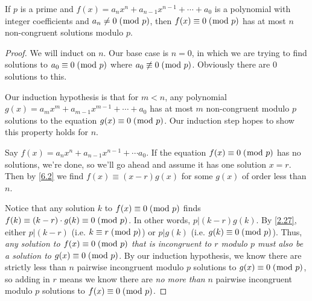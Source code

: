 \documentclass[../main.tex]{subfiles}
\begin{document}
\begin{thm} \label{6.3}
  If $p$ is a prime and $f(x) = a_n x^n + a_{n-1} x^{n-1} + \cdots + a_0$ is a polynomial with integer coefficients and $a_n \neq 0 \; (\bmod \; p)$, then $f(x) \equiv 0 \; (\bmod \; p)$ has at most $n$ non-congruent solutions modulo $p$.
\end{thm}

\begin{proof}
  We will induct on $n$. Our base case is $n = 0$, in which we are trying to find solutions to $a_0 \equiv 0 \; (\bmod \; p)$ where $a_0 \not \equiv 0 \; (\bmod \; p)$. Obviously there are $0$ solutions to this.

  Our induction hypothesis is that for $m < n$, any polynomial $g(x) = a_m x^m + a_{m-1} x^{m-1} + \cdots + a_0$ has at most $m$ non-congruent modulo $p$ solutions to the equation $g(x) \equiv 0 \; (\bmod \; p)$. Our induction step hopes to show this property holds for $n$.

  Say $f(x) = a_n x^n + a_{n-1} x^{n-1} + \cdots a_0$. If the equation $f(x) \equiv 0 \; (\bmod \; p)$ has no solutions, we're done, so we'll go ahead and assume it has one solution $x = r$. Then by \ref{6.2} we find $f(x) \equiv (x-r) g(x)$ for some $g(x)$ of order less than $n$.

  Notice that any solution $k$ to $f(x) \equiv 0 \; (\bmod \; p)$ finds $f(k) \equiv (k-r) \cdot g(k) \equiv 0 \; (\bmod \; p)$. In other words, $p | (k-r)g(k)$. By \ref{2.27}, either $p | (k-r)$ (i.e. $k \equiv r \; (\bmod \; p)$) or $p | g(k)$ (i.e. $g(k) \equiv 0 \; (\bmod \; p)$).
  Thus, \emph{any solution to $f(x) \equiv 0 \; (\bmod \; p)$ that is incongruent to $r$ modulo $p$ must also be a solution to $g(x) \equiv 0 \; (\bmod \; p)$}. By our induction hypothesis, we know there are strictly less than $n$ pairwise incongruent modulo $p$ solutions to $g(x) \equiv 0 \; (\bmod \; p)$, so adding in $r$ means we know there are \emph{no more than} $n$ pairwise incongruent modulo $p$ solutions to  $f(x) \equiv 0 \; (\bmod \; p)$.
\end{proof}
\end{document}
